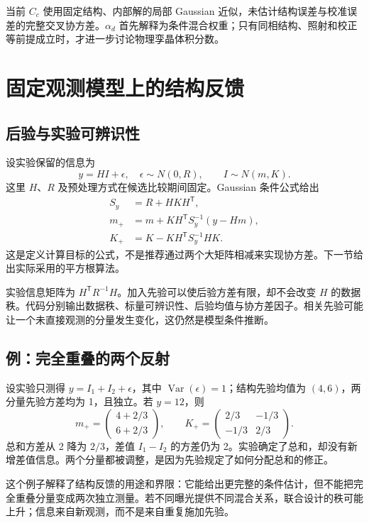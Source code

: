 \documentclass[UTF8,11pt,a4paper,fontset=fandol]{ctexart}
\newcommand{\T}{^{\mathsf T}}
\begin{document}
当前 $C_c$ 使用固定结构、内部解的局部 Gaussian 近似，未估计结构误差与校准误差的完整交叉协方差。$\alpha_d$ 首先解释为条件混合权重；只有同相结构、照射和校正等前提成立时，才进一步讨论物理孪晶体积分数。

\section{固定观测模型上的结构反馈}
\subsection{后验与实验可辨识性}

设实验保留的信息为
\begin{equation}
 y=HI+\epsilon,\quad \epsilon\sim N(0,R),\qquad
 I\sim N(m,K).
\end{equation}
这里 $H$、$R$ 及预处理方式在候选比较期间固定。Gaussian 条件公式给出
\begin{align}
 S_y&=R+HKH\T,\\
 m_+&=m+KH\T S_y^{-1}(y-Hm),\\
 K_+&=K-KH\T S_y^{-1}HK.
\end{align}
这是定义计算目标的公式，不是推荐通过两个大矩阵相减来实现协方差。下一节给出实际采用的平方根算法。

实验信息矩阵为 $H\T R^{-1}H$。加入先验可以使后验方差有限，却不会改变 $H$ 的数据秩。代码分别输出数据秩、标量可辨识性、后验均值与协方差因子。相关先验可能让一个未直接观测的分量发生变化，这仍然是模型条件推断。

\subsection{例：完全重叠的两个反射}

设实验只测得 $y=I_1+I_2+\epsilon$，其中 $\operatorname{Var}(\epsilon)=1$；结构先验均值为 $(4,6)$，两分量先验方差均为 1，且独立。若 $y=12$，则
\begin{equation}
 m_+=\begin{pmatrix}4+2/3\\6+2/3\end{pmatrix},\qquad
 K_+=\begin{pmatrix}2/3&-1/3\\-1/3&2/3\end{pmatrix}.
\end{equation}
总和方差从 2 降为 $2/3$，差值 $I_1-I_2$ 的方差仍为 2。实验确定了总和，却没有新增差值信息。两个分量都被调整，是因为先验规定了如何分配总和的修正。

这个例子解释了结构反馈的用途和界限：它能给出更完整的条件估计，但不能把完全重叠分量变成两次独立测量。若不同曝光提供不同混合关系，联合设计的秩可能上升；信息来自新观测，而不是来自重复施加先验。
\end{document}
